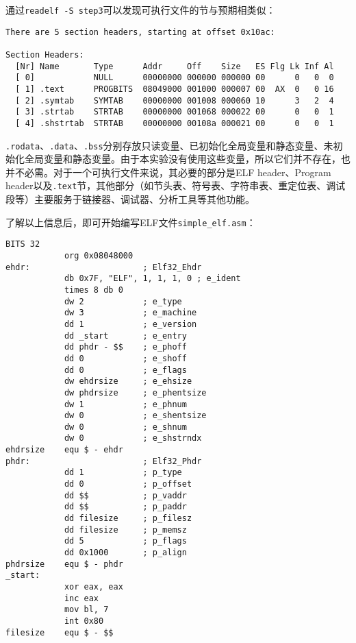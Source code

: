 \documentclass[a4paper, 11pt]{ctexart}
\begin{document}
通过\texttt{readelf -S step3}可以发现可执行文件的节与预期相类似：

\begin{verbatim}
There are 5 section headers, starting at offset 0x10ac:

Section Headers:
  [Nr] Name       Type      Addr     Off    Size   ES Flg Lk Inf Al
  [ 0]            NULL      00000000 000000 000000 00      0   0  0
  [ 1] .text      PROGBITS  08049000 001000 000007 00  AX  0   0 16
  [ 2] .symtab    SYMTAB    00000000 001008 000060 10      3   2  4
  [ 3] .strtab    STRTAB    00000000 001068 000022 00      0   0  1
  [ 4] .shstrtab  STRTAB    00000000 00108a 000021 00      0   0  1
\end{verbatim}

\texttt{.rodata}、\texttt{.data}、\texttt{.bss}分别存放只读变量、已初始化全局变量和静态变量、未初始化全局变量和静态变量。由于本实验没有使用这些变量，所以它们并不存在，也并不必需。对于一个可执行文件来说，其必要的部分是ELF header、Program header以及\texttt{.text}节，其他部分（如节头表、符号表、字符串表、重定位表、调试段等）主要服务于链接器、调试器、分析工具等其他功能。

了解以上信息后，即可开始编写ELF文件\texttt{simple\_elf.asm}：

\begin{verbatim}
BITS 32
            org 0x08048000
ehdr:                       ; Elf32_Ehdr
            db 0x7F, "ELF", 1, 1, 1, 0 ; e_ident
            times 8 db 0
            dw 2            ; e_type
            dw 3            ; e_machine
            dd 1            ; e_version
            dd _start       ; e_entry
            dd phdr - $$    ; e_phoff
            dd 0            ; e_shoff
            dd 0            ; e_flags
            dw ehdrsize     ; e_ehsize
            dw phdrsize     ; e_phentsize
            dw 1            ; e_phnum
            dw 0            ; e_shentsize
            dw 0            ; e_shnum
            dw 0            ; e_shstrndx
ehdrsize    equ $ - ehdr
phdr:                       ; Elf32_Phdr
            dd 1            ; p_type
            dd 0            ; p_offset
            dd $$           ; p_vaddr
            dd $$           ; p_paddr
            dd filesize     ; p_filesz
            dd filesize     ; p_memsz
            dd 5            ; p_flags
            dd 0x1000       ; p_align
phdrsize    equ $ - phdr
_start:
            xor eax, eax
            inc eax
            mov bl, 7
            int 0x80
filesize    equ $ - $$
\end{verbatim}
\end{document}
